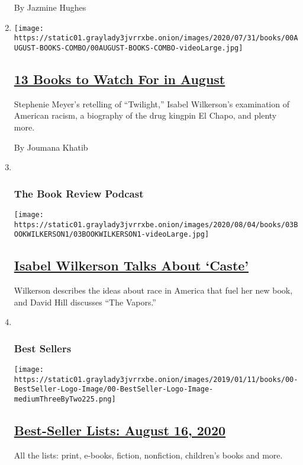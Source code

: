 \begin{enumerate}
  By Jazmine Hughes
\item
  \texttt{[image: https://static01.graylady3jvrrxbe.onion/images/2020/07/31/books/00AUGUST-BOOKS-COMBO/00AUGUST-BOOKS-COMBO-videoLarge.jpg]}

  \hypertarget{13-books-to-watch-for-in-august}{%
  \subsection{\texorpdfstring{\href{/2020/07/30/books/new-august-books.html}{13
  Books to Watch For in
  August}}{13 Books to Watch For in August}}\label{13-books-to-watch-for-in-august}}

  Stephenie Meyer's retelling of ``Twilight,'' Isabel Wilkerson's
  examination of American racism, a biography of the drug kingpin El
  Chapo, and plenty more.

  By Joumana Khatib
\item ~
  \hypertarget{the-book-review-podcast}{%
  \subsubsection{The Book Review
  Podcast}\label{the-book-review-podcast}}

  \texttt{[image: https://static01.graylady3jvrrxbe.onion/images/2020/08/04/books/03BOOKWILKERSON1/03BOOKWILKERSON1-videoLarge.jpg]}

  \hypertarget{isabel-wilkerson-talks-about-caste}{%
  \subsection{\texorpdfstring{\href{/2020/08/07/books/review/podcast-isabel-wilkerson-caste-david-hill-vapors.html}{Isabel
  Wilkerson Talks About
  `Caste'}}{Isabel Wilkerson Talks About `Caste'}}\label{isabel-wilkerson-talks-about-caste}}

  Wilkerson describes the ideas about race in America that fuel her new
  book, and David Hill discusses ``The Vapors.''
\item ~
  \hypertarget{best-sellers}{%
  \subsubsection{Best Sellers}\label{best-sellers}}

  \texttt{[image: https://static01.graylady3jvrrxbe.onion/images/2019/01/11/books/00-BestSeller-Logo-Image/00-BestSeller-Logo-Image-mediumThreeByTwo225.png]}

  \hypertarget{best-seller-lists-august-16-2020}{%
  \subsection{\texorpdfstring{\href{/interactive/2020/01/29/books/review/best-sellers-promo-for-front-copy2.html}{Best-Seller
  Lists: August 16,
  2020}}{Best-Seller Lists: August 16, 2020}}\label{best-seller-lists-august-16-2020}}

  All the lists: print, e-books, fiction, nonfiction, children's books
  and more.
\end{enumerate}

